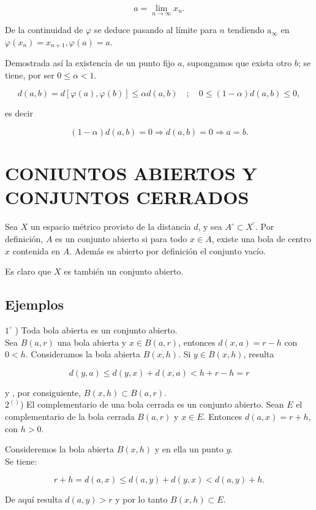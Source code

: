 \documentclass[10pt]{article}
\theoremstyle{plain}
\theoremstyle{definition}
\theoremstyle{remark}
\begin{document}
$$
a=\lim _{n \rightarrow \infty} x_{n} .
$$

De la continuidad de $\varphi$ se deduce pasando al límite para $n$ tendiendo $\mathrm{a}_{\infty}$ en $\varphi\left(x_{n}\right)=x_{n+1}, \varphi(a)=a$.

Demostrada así la existencia de un punto fijo $a$, supongamos que exista otro $b$; se tiene, por ser $0 \leqslant \alpha<1$.

$$
d(a, b)=d[\varphi(a), \varphi(b)] \leqslant \alpha d(a, b) \quad ; \quad 0 \leqslant(1-\alpha) d(a, b) \leqslant 0,
$$

es decir

$$
(1-\alpha) d(a, b)=0 \Rightarrow d(a, b)=0 \Rightarrow a=b .
$$

\section*{CONIUNTOS ABIERTOS Y CONJUNTOS CERRADOS}
Sea $X$ un espacio métrico provisto de la distancia $d$, y sea $A^{\circ} \subset X^{\prime}$. Por definición, $A$ es un conjunto abierto si para todo $x \in A$, existe una bola de centro $x$ contenida en $A$. Además es abierto por definición el conjunto vacío.

Es claro que $X$ es también un conjunto abierto.

\subsection{Ejemplos}
$1^{\circ}$ ) Toda bola abierta es un conjunto abierto.\\
Sea $B(a, r)$ una bola abierta y $x \in B(a, r)$, entonces $d(x, a)=r-h$ con $0<h$. Consideramos la bola abierta $B(x, h)$. Si $y \in B(x, h)$, resulta

$$
d(y, a) \leqslant d(y, x)+d(x, a)<h+r-h=r
$$

y , por consiguiente, $B(x, h) \subset B(a, r)$.\\
$2^{()}$) El complementario de una bola cerrada es un conjunto abierto. Sean $E$ el complementario de la bola cerrada $B(a, r)$ y $x \in E$. Entonces $d(a, x)=r+h$, con $h>0$.

Consideremos la bola abierta $B(x, h)$ y en ella un punto $y$.\\
Se tiene:

$$
r+h=d(a, x) \leqslant d(a, y)+d(y, x)<d(a, y)+h .
$$

De aquí resulta $d(a, y)>r$ y por lo tanto $B(x, h) \subset E$.
\end{document}
